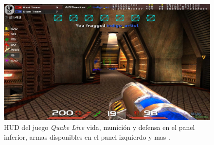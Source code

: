 \begin{figure}[H]
\centering
\includegraphics[width=0.95\linewidth]{media/quake_live.jpg} 
\caption{HUD del juego \emph{Quake Live} vida, munición y defensa en el panel inferior, armas disponibles en el panel izquierdo y mas \cite{quake_live}.}
\end{figure}


